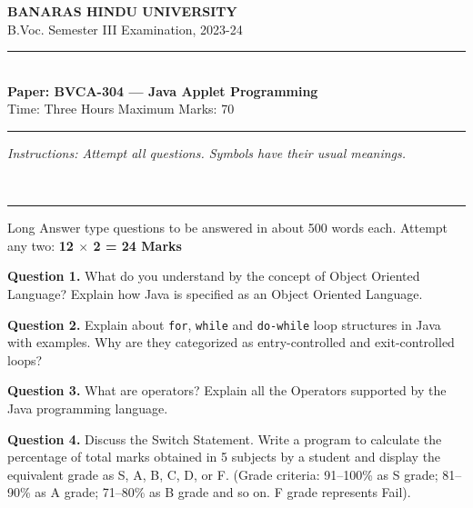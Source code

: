 \documentclass[11pt,a4paper]{article}
\begin{document}
\begin{center}
  {\large\bfseries BANARAS HINDU UNIVERSITY}\\[2pt]
  {\normalsize B.Voc. Semester III Examination, 2023-24}\\[6pt]
  \rule{0.8\linewidth}{0.5pt}\\[6pt]
  {\large\bfseries Paper: BVCA-304 --- Java Applet Programming}\\[4pt]
  {\normalsize Time: Three Hours \hfill Maximum Marks: 70}
\end{center}

\rule{\linewidth}{0.4pt}

\smallskip



\noindent   \textit{Instructions: Attempt all questions. Symbols have their usual meanings.}

\bigskip




\\[4pt]
\rule{\linewidth}{0.4pt}\smallskip

Long Answer type questions to be answered in about 500 words each. Attempt any two: \hfill   \textbf{12 $ \times$ 2 = 24 Marks}

\medskip



\noindent   \textbf{Question 1.} What do you understand by the concept of Object Oriented Language? Explain how Java is specified as an Object Oriented Language.

\medskip



\noindent   \textbf{Question 2.} Explain about   \texttt{for},   \texttt{while} and   \texttt{do-while} loop structures in Java with examples. Why are they categorized as entry-controlled and exit-controlled loops?

\medskip



\noindent   \textbf{Question 3.} What are operators? Explain all the Operators supported by the Java programming language.

\medskip



\noindent   \textbf{Question 4.} Discuss the Switch Statement. Write a program to calculate the percentage of total marks obtained in 5 subjects by a student and display the equivalent grade as S, A, B, C, D, or F. (Grade criteria: 91--100\% as S grade; 81--90\% as A grade; 71--80\% as B grade and so on. F grade represents Fail).
\end{document}
